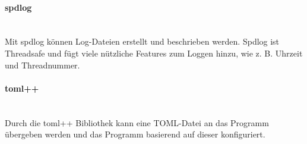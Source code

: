 \paragraph{spdlog} \mbox{} \vspace{2mm} \\
Mit spdlog können Log-Dateien erstellt und beschrieben werden. Spdlog ist Threadsafe und fügt viele nützliche Features zum Loggen hinzu, wie z. B. Uhrzeit und Threadnummer.


\paragraph{toml++} \mbox{} \vspace{2mm} \\
Durch die toml++ Bibliothek kann eine TOML-Datei an das Programm übergeben werden und das Programm basierend auf dieser konfiguriert.